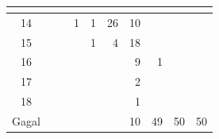 \begin{minipage}[\minipagealign]{\minipagewidth}
{\begin{tabular}{|c|lllllllll|}
\multicolumn{1}{r|}{} & \multicolumn{1}{r|}{} & \\ \hline 14 & \multicolumn{1}{r|}{} & \multicolumn{1}{r|}{} & \multicolumn{1}{r|}{1} & \multicolumn{1}{r|}{1} & \multicolumn{1}{r|}{26} & \multicolumn{1}{r|}{10} & \multicolumn{1}{r|}{} & \multicolumn{1}{r|}{} & \\ \hline 15 & \multicolumn{1}{r|}{} & \multicolumn{1}{r|}{} & \multicolumn{1}{r|}{} & \multicolumn{1}{r|}{1} & \multicolumn{1}{r|}{4} & \multicolumn{1}{r|}{18} & \multicolumn{1}{r|}{} & \multicolumn{1}{r|}{} & \\ \hline 16 & \multicolumn{1}{r|}{} & \multicolumn{1}{r|}{} & \multicolumn{1}{r|}{} & \multicolumn{1}{r|}{} & \multicolumn{1}{r|}{} & \multicolumn{1}{r|}{9} & \multicolumn{1}{r|}{1} & \multicolumn{1}{r|}{} & \\ \hline 17 & \multicolumn{1}{r|}{} & \multicolumn{1}{r|}{} & \multicolumn{1}{r|}{} & \multicolumn{1}{r|}{} & \multicolumn{1}{r|}{} & \multicolumn{1}{r|}{2} & \multicolumn{1}{r|}{} & \multicolumn{1}{r|}{} & \\ \hline 18 & \multicolumn{1}{r|}{} & \multicolumn{1}{r|}{} & \multicolumn{1}{r|}{} & \multicolumn{1}{r|}{} & \multicolumn{1}{r|}{} & \multicolumn{1}{r|}{1} & \multicolumn{1}{r|}{} & \multicolumn{1}{r|}{} & \\ \hline Gagal & \multicolumn{1}{r|}{} & \multicolumn{1}{r|}{} & \multicolumn{1}{r|}{} & \multicolumn{1}{r|}{} & \multicolumn{1}{r|}{} & \multicolumn{1}{r|}{10} & \multicolumn{1}{r|}{49} & \multicolumn{1}{r|}{50} & 50 \\ \hline
		\end{tabular}
	}
	\label{tab:freq-emd-large-pb}
\end{minipage}
